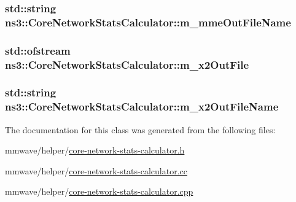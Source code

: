 \subsubsection[{\texorpdfstring{m\+\_\+mme\+Out\+File\+Name}{m_mmeOutFileName}}]{\setlength{\rightskip}{0pt plus 5cm}std\+::string ns3\+::\+Core\+Network\+Stats\+Calculator\+::m\+\_\+mme\+Out\+File\+Name\hspace{0.3cm}{\ttfamily [private]}}\hypertarget{classns3_1_1CoreNetworkStatsCalculator_a15b992cbcfef20b036aee6b4892a7eb2}{}\label{classns3_1_1CoreNetworkStatsCalculator_a15b992cbcfef20b036aee6b4892a7eb2}
\subsubsection[{\texorpdfstring{m\+\_\+x2\+Out\+File}{m_x2OutFile}}]{\setlength{\rightskip}{0pt plus 5cm}std\+::ofstream ns3\+::\+Core\+Network\+Stats\+Calculator\+::m\+\_\+x2\+Out\+File\hspace{0.3cm}{\ttfamily [private]}}\hypertarget{classns3_1_1CoreNetworkStatsCalculator_ad47dfbd25b5bc898c3c6233384b67f50}{}\label{classns3_1_1CoreNetworkStatsCalculator_ad47dfbd25b5bc898c3c6233384b67f50}
\subsubsection[{\texorpdfstring{m\+\_\+x2\+Out\+File\+Name}{m_x2OutFileName}}]{\setlength{\rightskip}{0pt plus 5cm}std\+::string ns3\+::\+Core\+Network\+Stats\+Calculator\+::m\+\_\+x2\+Out\+File\+Name\hspace{0.3cm}{\ttfamily [private]}}\hypertarget{classns3_1_1CoreNetworkStatsCalculator_a2ce9177d5321a09712ffaca4de8fa744}{}\label{classns3_1_1CoreNetworkStatsCalculator_a2ce9177d5321a09712ffaca4de8fa744}


The documentation for this class was generated from the following files\+:\begin{DoxyCompactItemize}
\item 
mmwave/helper/\hyperlink{core-network-stats-calculator_8h}{core-\/network-\/stats-\/calculator.\+h}\item 
mmwave/helper/\hyperlink{core-network-stats-calculator_8cc}{core-\/network-\/stats-\/calculator.\+cc}\item 
mmwave/helper/\hyperlink{core-network-stats-calculator_8cpp}{core-\/network-\/stats-\/calculator.\+cpp}\end{DoxyCompactItemize}
